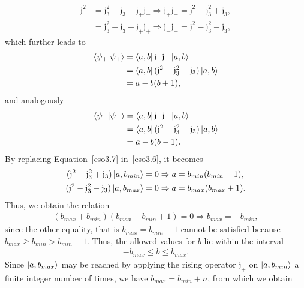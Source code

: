 \documentclass[12pt,a4paper]{report}
\theoremstyle{definition}
\theoremstyle{remark}
\theoremstyle{remark}
\begin{document}
\begin{equation}\label{eso3.7}
\begin{aligned}
\mathfrak{j}^2&=\mathfrak{j}_3^2-\mathfrak{j}_3+\mathfrak{j}_+\mathfrak{j}_- \Rightarrow \mathfrak{j}_+\mathfrak{j}_-=\mathfrak{j}^2-\mathfrak{j}_3^2+\mathfrak{j}_3,\\
&=\mathfrak{j}_3^2-\mathfrak{j}_3+\mathfrak{j}_+\mathfrak{j}_+ \Rightarrow \mathfrak{j}_-\mathfrak{j}_+=\mathfrak{j}^2-\mathfrak{j}_3^2-\mathfrak{j}_3,
\end{aligned}
\end{equation}
which further leads to
\begin{equation}\label{eso3.8}
\begin{aligned}
\braket{\psi_+|\psi_+}&=\bra{a,b}\mathfrak{j}_-\mathfrak{j}_+\ket{a,b}\\
&=\bra{a,b}(\mathfrak{j}^2-\mathfrak{j}_3^2-\mathfrak{j}_3)\ket{a,b} \\
&=a-b(b+1),
\end{aligned}
\end{equation}
and analogously
\begin{equation}\label{eso3.9}
\begin{aligned}
\braket{\psi_-|\psi_-}&=\bra{a,b}\mathfrak{j}_+\mathfrak{j}_-\ket{a,b}\\
&=\bra{a,b}(\mathfrak{j}^2-\mathfrak{j}_3^2+\mathfrak{j}_3)\ket{a,b} \\
&=a-b(b-1).
\end{aligned}
\end{equation}
By replacing Equation~\ref{eso3.7} in~\ref{eso3.6}, it becomes
\begin{align*}
(\mathfrak{j}^2-\mathfrak{j}_3^2+\mathfrak{j}_3)\ket{a,b_{min}}&=0 \Rightarrow a=b_{min}(b_{min}-1),\\
(\mathfrak{j}^2-\mathfrak{j}_3^2-\mathfrak{j}_3)\ket{a,b_{max}}&=0 \Rightarrow a=b_{max}(b_{max}+1).
\end{align*}
Thus, we obtain the relation
\begin{align*}
(b_{max}+b_{min})(b_{max}-b_{min}+1)=0\Rightarrow b_{max}=-b_{min},
\end{align*}
since the other equality, that is $b_{max}=b_{min}-1$ cannot be satisfied because $b_{max}\geq b_{min} > b_{min}-1$. Thus, the allowed values for $b$ lie within the interval
\begin{align*}
-b_{max}\leq b\leq b_{max}.
\end{align*}
Since $\ket{a,b_{max}}$ may be reached by applying the rising operator $\mathfrak{j}_+$ on $\ket{a,b_{min}}$ a finite integer number of times, we have $b_{max}=b_{min}+n$, from which we obtain
\end{document}
